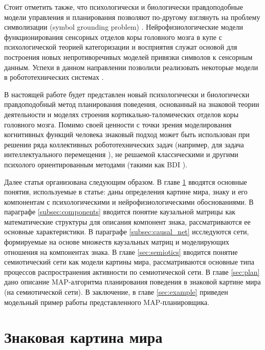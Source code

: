 \documentclass[12pt]{scrartcl}
\begin{document}
	Стоит отметить также, что психологически и биологически правдоподобные модели управления и планирования позволяют по-другому взглянуть на проблему символизации (symbol grounding problem) \cite{Harnad1990,Barsalou1999,Chella2003,Besold2015}. Нейрофизиологические модели функционирования сенсорных отделов коры головного мозга в купе с психологической теорией категоризации и восприятия служат основой для построения новых непротиворечивых моделей привязки символов к сенсорным данным. Успехи в данном направлении позволили реализовать некоторые модели в робототехнических системах \cite{Heintz2010}. 
	
	В настоящей работе будет представлен новый психологически и биологически правдоподобный метод планирования поведения, основанный на знаковой теории деятельности и моделях строения кортикально-таломических отделов коры головного мозга. Помимо своей ценности с точки зрения моделирования когнитивных функций человека знаковый подход может быть использован при решении ряда коллективных робототехнических задач (например, для задача интеллектуального перемещения \cite{Panov2015g,Panov2016d}), не решаемой классическими и другими психолого ориентированным методами (такими как BDI \cite{Sardina2006}).
		
	Далее статья организована следующим образом. В главе \ref{sec:swm} вводятся основные понятия, используемые в статье: даны определения картине мира, знаку и его компонентам с психологическими и нейрофизиологическими обоснованиями. В параграфе \ref{subsec:components} вводится понятие каузальной матрицы как математические структуры для описания компонент знака, рассматриваются ее основные характеристики. В параграфе \ref{subsec:causal_net} исследуются сети, формируемые на основе множеств каузальных матриц и моделирующих отношения на компонентах знака. В главе \ref{sec:semiotics} вводится понятие семиотический сети как модели картины мира, рассматриваются основные типа процессов распространения активности по семиотической сети. В главе \ref{sec:plan} дано описание MAP-алгоритма планирования поведения в знаковой картине мира (на семиотической сети). В заключение, в главе \ref{sec:example} приведен модельный пример работы представленного MAP-планировщика.
	
	\section{Знаковая картина мира}\label{sec:swm}
\end{document}
